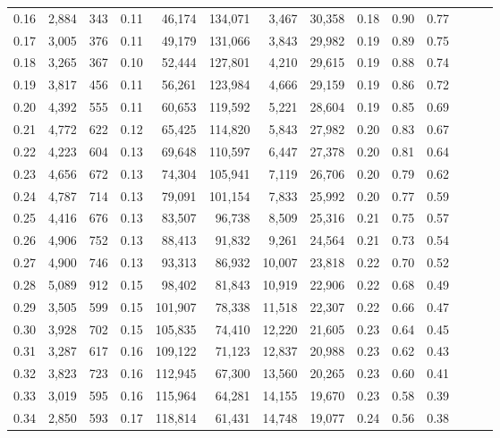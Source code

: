 \begin{tabular}{rrrrrrrrrrrrrr}
0.16 &  2,884 &  343 &  0.11 &   46,174 &  134,071 &   3,467 &  30,358 &  0.18 &  0.90 &      0.77 \\
0.17 &  3,005 &  376 &  0.11 &   49,179 &  131,066 &   3,843 &  29,982 &  0.19 &  0.89 &      0.75 \\
0.18 &  3,265 &  367 &  0.10 &   52,444 &  127,801 &   4,210 &  29,615 &  0.19 &  0.88 &      0.74 \\
0.19 &  3,817 &  456 &  0.11 &   56,261 &  123,984 &   4,666 &  29,159 &  0.19 &  0.86 &      0.72 \\
0.20 &  4,392 &  555 &  0.11 &   60,653 &  119,592 &   5,221 &  28,604 &  0.19 &  0.85 &      0.69 \\
0.21 &  4,772 &  622 &  0.12 &   65,425 &  114,820 &   5,843 &  27,982 &  0.20 &  0.83 &      0.67 \\
0.22 &  4,223 &  604 &  0.13 &   69,648 &  110,597 &   6,447 &  27,378 &  0.20 &  0.81 &      0.64 \\
0.23 &  4,656 &  672 &  0.13 &   74,304 &  105,941 &   7,119 &  26,706 &  0.20 &  0.79 &      0.62 \\
0.24 &  4,787 &  714 &  0.13 &   79,091 &  101,154 &   7,833 &  25,992 &  0.20 &  0.77 &      0.59 \\
0.25 &  4,416 &  676 &  0.13 &   83,507 &   96,738 &   8,509 &  25,316 &  0.21 &  0.75 &      0.57 \\
0.26 &  4,906 &  752 &  0.13 &   88,413 &   91,832 &   9,261 &  24,564 &  0.21 &  0.73 &      0.54 \\
0.27 &  4,900 &  746 &  0.13 &   93,313 &   86,932 &  10,007 &  23,818 &  0.22 &  0.70 &      0.52 \\
0.28 &  5,089 &  912 &  0.15 &   98,402 &   81,843 &  10,919 &  22,906 &  0.22 &  0.68 &      0.49 \\
0.29 &  3,505 &  599 &  0.15 &  101,907 &   78,338 &  11,518 &  22,307 &  0.22 &  0.66 &      0.47 \\
0.30 &  3,928 &  702 &  0.15 &  105,835 &   74,410 &  12,220 &  21,605 &  0.23 &  0.64 &      0.45 \\
0.31 &  3,287 &  617 &  0.16 &  109,122 &   71,123 &  12,837 &  20,988 &  0.23 &  0.62 &      0.43 \\
0.32 &  3,823 &  723 &  0.16 &  112,945 &   67,300 &  13,560 &  20,265 &  0.23 &  0.60 &      0.41 \\
0.33 &  3,019 &  595 &  0.16 &  115,964 &   64,281 &  14,155 &  19,670 &  0.23 &  0.58 &      0.39 \\
0.34 &  2,850 &  593 &  0.17 &  118,814 &   61,431 &  14,748 &  19,077 &  0.24 &  0.56 &      0.38 \\

\end{tabular}
